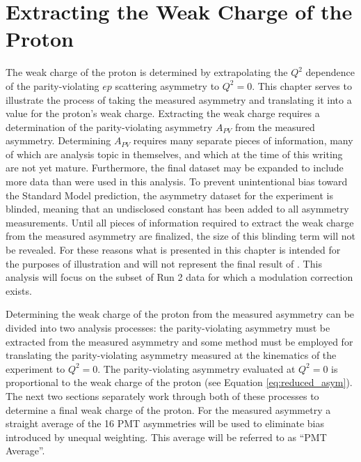 
\chapter{Extracting the Weak Charge of the Proton}
\captionsetup{justification=justified,singlelinecheck=false}

\label{Ch:extracting_qwp}


The weak charge of the proton is determined by extrapolating the $Q^2$ dependence of the  parity-violating $ep$ scattering asymmetry to $Q^2=0$. This chapter serves to illustrate the process of taking the measured asymmetry and translating it into a value for the proton's weak charge. Extracting the weak charge requires a determination of the parity-violating asymmetry $A_{PV}$ from the measured asymmetry. Determining $A_{PV}$ requires many separate pieces of information, many of which are analysis topic in themselves, and which at the time of this writing are not yet mature. Furthermore, the final dataset may be expanded to include more data than were used in this analysis. To prevent unintentional bias toward the Standard Model prediction, the asymmetry dataset for the \Qs experiment is blinded, meaning that an undisclosed constant has been added to all asymmetry measurements. Until all pieces of information required to extract the weak charge from the measured asymmetry are finalized, the size of this blinding term will not be revealed. For these reasons what is presented in this chapter is intended for the purposes of illustration and will not represent the final result of \Q. This analysis will focus on the subset of Run 2 data for which a modulation correction exists.  

Determining the weak charge of the proton from the measured asymmetry can be divided into two analysis processes: the parity-violating asymmetry must be extracted from the measured asymmetry and some method must be employed for translating the parity-violating asymmetry measured at the kinematics of the \Qs experiment to $Q^2=0$. The parity-violating asymmetry evaluated at $Q^2=0$ is proportional to the weak charge of the proton (see Equation \ref{eq:reduced_asym}). The next two sections separately work through both of these processes to determine a final weak charge of the proton. For the measured asymmetry a straight average of the 16 PMT asymmetries will be used to eliminate bias introduced by unequal weighting. This average will be referred to as ``PMT Average''.

